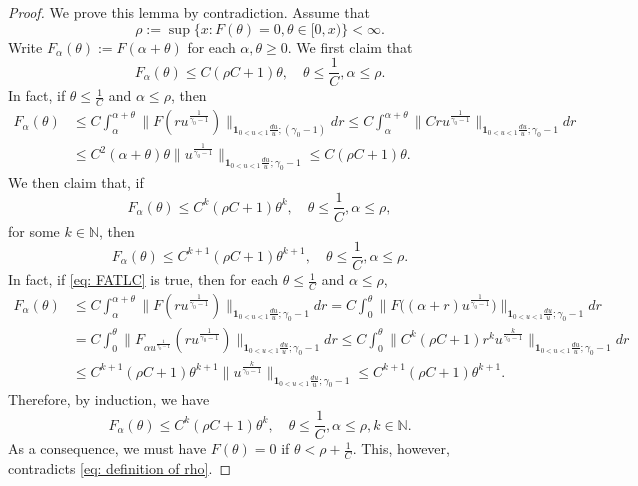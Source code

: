 \documentclass[12pt, a4paper]{amsart}
\theoremstyle{definition}
\numberwithin{equation}{section}
\begin{document}
\begin{proof}
    We prove this lemma by contradiction.
	Assume that 
\[\label{eq: definition of rho}
	\rho :=  \sup\{x: F(\theta) = 0, \theta \in [0,x)\} < \infty.
\]
	Write $F_\alpha (\theta) := F(\alpha + \theta)$ for each $\alpha, \theta \geq 0$.
	We first claim that
\[
	F_\alpha (\theta)
	\leq C(\rho C + 1) \theta,
	\quad \theta \leq \frac{1}{C}, \alpha \leq \rho.
\]
	In fact, if $\theta \leq \frac{1}{C}$ and $\alpha \leq \rho$, then
\[\begin{split}
	F_\alpha (\theta)
	&\leq C\int_\alpha^{\alpha + \theta} \|F(ru^{\frac{1}{\gamma_0 - 1}}) \|_{\mathbf 1_{0<u<1}\frac{du}{u}; (\gamma_0 - 1)} dr
	\leq C\int_\alpha^{\alpha + \theta} \|Cru^{\frac{1}{\gamma_0 - 1}} \|_{\mathbf 1_{0<u<1}\frac{du}{u}; \gamma_0 - 1} dr
	\\&\leq C^2 (\alpha + \theta) \theta \|u^{\frac{1}{\gamma_0 - 1}} \|_{\mathbf 1_{0<u<1}\frac{du}{u}; \gamma_0 - 1}
	\leq C(\rho C + 1) \theta.
\end{split}\]
	We then claim that, if
\[\label{eq: FATLC}
	F_\alpha (\theta)
	\leq C^k(\rho C + 1) \theta^k,
	\quad \theta \leq \frac{1}{C}, \alpha \leq \rho,
\]
	for some $k \in \mathbb N$, then
\[
	F_\alpha (\theta)
	\leq C^{k+1}(\rho C + 1) \theta^{k+1},
	\quad \theta \leq \frac{1}{C}, \alpha \leq \rho.
	\]
	In fact, if \eqref{eq: FATLC} is true, then for each $\theta \leq \frac{1}{C}$ and $\alpha \leq \rho$,
\[\begin{split}
	F_\alpha (\theta)
	&\leq C\int_\alpha^{\alpha + \theta} \|F(ru^{\frac{1}{\gamma_0 - 1}}) \|_{\mathbf 1_{0<u<1}\frac{du}{u}; \gamma_0 - 1} dr
	=  C\int_0^\theta \big \|F\big( (\alpha + r)u^{\frac{1}{\gamma_0 - 1}} \big ) \big \|_{\mathbf 1_{0<u<1}\frac{du}{u}; \gamma_0 - 1} dr
	\\& =  C\int_0^\theta \|F_{\alpha u^{\frac{1}{\gamma_0 - 1}}}( ru^{\frac{1}{\gamma_0 - 1}}) \|_{\mathbf 1_{0<u<1}\frac{du}{u}; \gamma_0 - 1} dr
	\leq C\int_0^ \theta \|C^k (\rho C+ 1) r^k u^{\frac{k}{\gamma_0 - 1} } \|_{\mathbf 1_{0<u<1}\frac{du}{u}; \gamma_0 - 1} dr
	\\&\leq C^{k+1} (\rho C + 1) \theta^{k+1} \|u^{\frac{k}{\gamma_0 - 1} } \|_{\mathbf 1_{0<u<1}\frac{du}{u}; \gamma_0 - 1}
	\leq C^{k+1} (\rho C+1) \theta^{k+1} .
\end{split}\]
	Therefore, by induction, we have
\[
	F_\alpha (\theta)
	\leq C^k(\rho C + 1) \theta^k,
	\quad \theta \leq \frac{1}{C}, \alpha \leq \rho, k \in \mathbb N.
\]
	As a consequence, we must have $F(\theta) = 0$ if $\theta < \rho + \frac{1}{C}$.
	This, however, contradicts \eqref{eq: definition of rho}.
\end{proof}
\end{document}
